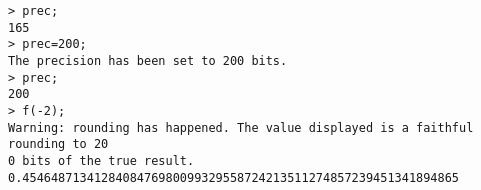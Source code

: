 \begin{center}\begin{minipage}{15cm}\begin{Verbatim}[frame=single]
> prec;
165
> prec=200;
The precision has been set to 200 bits.
> prec;
200
> f(-2);
Warning: rounding has happened. The value displayed is a faithful rounding to 20
0 bits of the true result.
0.4546487134128408476980099329558724213511274857239451341894865
\end{Verbatim}
\end{minipage}\end{center}
